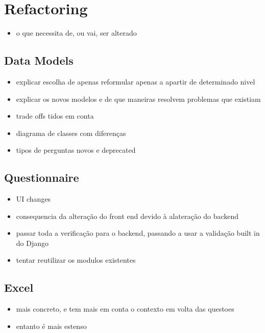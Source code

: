 \section{Refactoring}
\begin{itemize}
    \item o que necessita de, ou vai, ser alterado
\end{itemize}

\subsection{Data Models}
\begin{itemize}
    \item explicar escolha de apenas reformular apenas a apartir de determinado nivel
    \item explicar os novos modelos e de que maneiras resolvem problemas que existiam
    \item trade offs tidos em conta
    \item diagrama de classes com diferenças
    \item tipos de perguntas novos e deprecated
\end{itemize}

\subsection{Questionnaire}
\begin{itemize}
    \item UI changes
    \item consequencia da alteração do front end devido à alateração do backend
    \item passar toda a verificação para o backend, passando a usar a validação built in do Django
    \item tentar reutilizar os modulos existentes
\end{itemize}

\subsection{Excel}
\begin{itemize}
    \item mais concreto, e tem mais em conta o contexto em volta das questoes
    \item entanto é mais estenso
\end{itemize}
